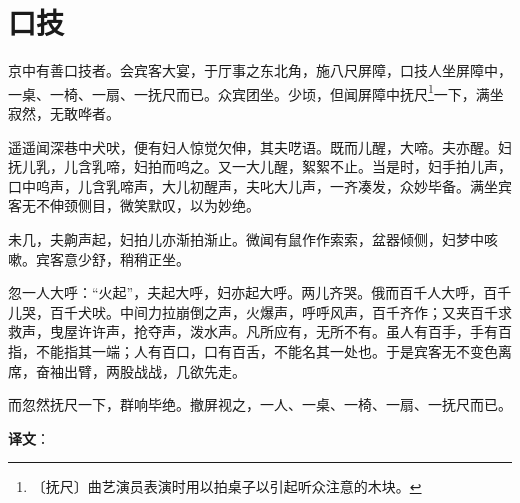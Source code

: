 \documentclass[12pt,UTF-8,openany,a4]{ctexbook}
\begin{document}
\chapter{口技}

\begin{large}
    
    京中有善口技者。会宾客大宴，于厅事之东北角，施八尺屏障，口技人坐屏障中，一桌、一椅、一扇、一抚尺而已。众宾团坐。少顷，但闻屏障中抚尺\footnote{〔抚尺〕\yiwen 曲艺演员表演时用以拍桌子以引起听众注意的木块。}一下，满坐寂然，无敢哗者。
    
    遥遥闻深巷中犬吠，便有妇人惊觉欠伸，其夫呓语。既而儿醒，大啼。夫亦醒。妇抚儿乳，儿含乳啼，妇拍而呜之。又一大儿醒，絮絮不止。当是时，妇手拍儿声，口中呜声，儿含乳啼声，大儿初醒声，夫叱大儿声，一齐凑发，众妙毕备。满坐宾客无不伸颈侧目，微笑默叹，以为妙绝。
    
    未几，夫齁声起，妇拍儿亦渐拍渐止。微闻有鼠作作索索，盆器倾侧，妇梦中咳嗽。宾客意少舒，稍稍正坐。
    
    忽一人大呼：“火起”，夫起大呼，妇亦起大呼。两儿齐哭。俄而百千人大呼，百千儿哭，百千犬吠。中间力拉崩倒之声，火爆声，呼呼风声，百千齐作；又夹百千求救声，曳屋许许声，抢夺声，泼水声。凡所应有，无所不有。虽人有百手，手有百指，不能指其一端；人有百口，口有百舌，不能名其一处也。于是宾客无不变色离席，奋袖出臂，两股战战，几欲先走。
    
    而忽然抚尺一下，群响毕绝。撤屏视之，一人、一桌、一椅、一扇、一抚尺而已。

\end{large}


\newpage

\begin{Large}
   \noindent \textbf{译文}：
\end{Large}

\vspace{1em}
\end{document}
